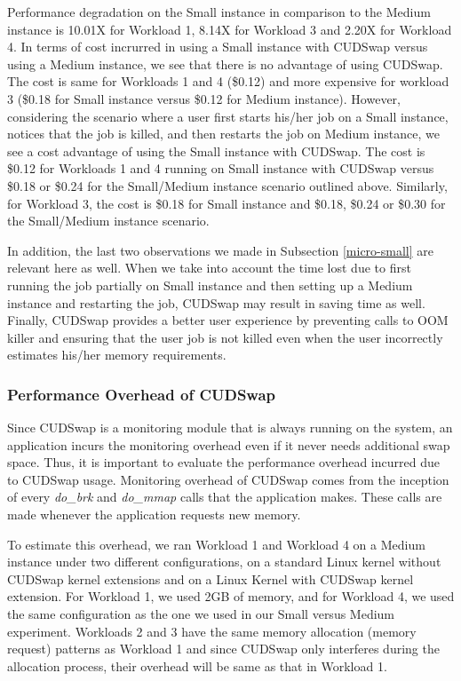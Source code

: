 Performance degradation on the Small instance in comparison to the Medium
instance is 10.01X for Workload 1, 8.14X for Workload 3 and 2.20X for
Workload 4. In terms of cost incrurred in using a Small instance with
CUDSwap versus using a Medium instance, we see that there is no advantage
of using CUDSwap. The cost is same for Workloads 1 and 4 (\$0.12) and
more expensive for workload 3 (\$0.18 for Small instance versus \$0.12 for
Medium instance). However, considering the scenario where a user first starts
his/her job on a Small instance, notices that the job is killed, and then
restarts the job on Medium instance, we see a cost advantage of using
the Small instance with CUDSwap. The cost is \$0.12 for Workloads 1
and 4 running on Small instance with CUDSwap versus \$0.18 or \$0.24 for
the Small/Medium instance scenario outlined above. Similarly, for
Workload 3, the cost is \$0.18 for Small instance and \$0.18, \$0.24 or
\$0.30 for the Small/Medium instance scenario.

In addition, the last two observations we made in Subsection \ref{micro-small}
are relevant here as well. When we take into account the time
lost due to first running the job partially on Small instance and then
setting up a Medium instance and restarting the job, CUDSwap may result in
saving time as well. Finally, CUDSwap provides a better user experience
by preventing calls to OOM killer and ensuring that the user job is
not killed even when the user incorrectly estimates his/her memory requirements.

\subsubsection{Performance Overhead of CUDSwap}

Since CUDSwap is a monitoring module that is always running on the system,
an application incurs the monitoring overhead even if it never needs
additional swap space. Thus, it is important to evaluate the performance
overhead incurred due to CUDSwap usage. Monitoring overhead of CUDSwap
comes from the inception of every {\it do\_brk} and {\it do\_mmap} calls
that the application makes. These calls are made whenever the application
requests new memory.

To estimate this overhead, we ran Workload 1 and Workload 4 on a Medium
instance under two different configurations, on a standard Linux kernel
without CUDSwap kernel extensions and on a Linux Kernel with CUDSwap kernel
extension. For Workload 1, we used 2GB of memory, and for Workload 4,
we used the same configuration as the one we used in our Small versus Medium
experiment. Workloads 2 and 3 have the same memory
allocation (memory request) patterns as Workload 1 and since CUDSwap only
interferes during the allocation process, their overhead will be same as
that in Workload 1.

